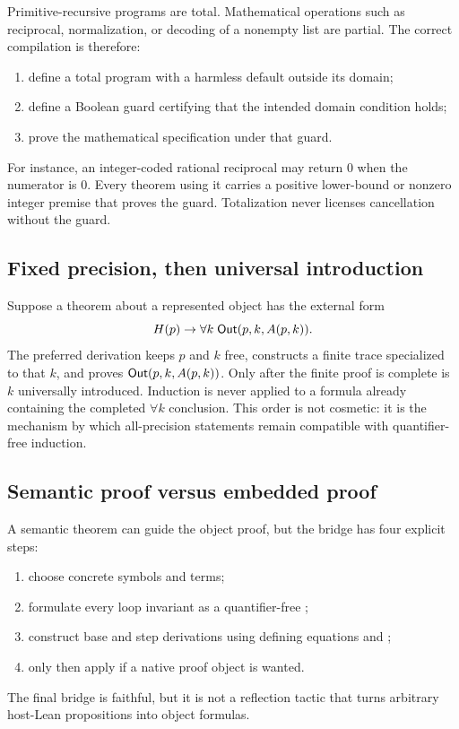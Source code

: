 Primitive-recursive programs are total.  Mathematical operations such as reciprocal, normalization, or decoding of a nonempty list are partial.  The correct compilation is therefore:
\begin{enumerate}[label=(\alph*)]
\item define a total program with a harmless default outside its domain;
\item define a Boolean guard certifying that the intended domain condition holds;
\item prove the mathematical specification under that guard.
\end{enumerate}
For instance, an integer-coded rational reciprocal may return $0$ when the numerator is $0$.  Every theorem using it carries a positive lower-bound or nonzero integer premise that proves the guard.  Totalization never licenses cancellation without the guard.

\subsection{Fixed precision, then universal introduction}

Suppose a theorem about a represented object has the external form
\[
  H(p)\to\forall k\;\mathsf{Out}(p,k,A(p,k)).
\]
The preferred derivation keeps $p$ and $k$ free, constructs a finite trace specialized to that $k$, and proves $\mathsf{Out}(p,k,A(p,k))$.  Only after the finite proof is complete is $k$ universally introduced.  Induction is never applied to a formula already containing the completed $\forall k$ conclusion.  This order is not cosmetic: it is the mechanism by which all-precision statements remain compatible with quantifier-free induction.

\subsection{Semantic proof versus embedded proof}

A semantic theorem can guide the object proof, but the bridge has four explicit steps:
\begin{enumerate}
\item choose concrete  symbols and  terms;
\item formulate every loop invariant as a quantifier-free ;
\item construct base and step derivations using defining equations and ;
\item only then apply  if a native proof object is wanted.
\end{enumerate}
The final bridge is faithful, but it is not a reflection tactic that turns arbitrary host-Lean propositions into object formulas.
